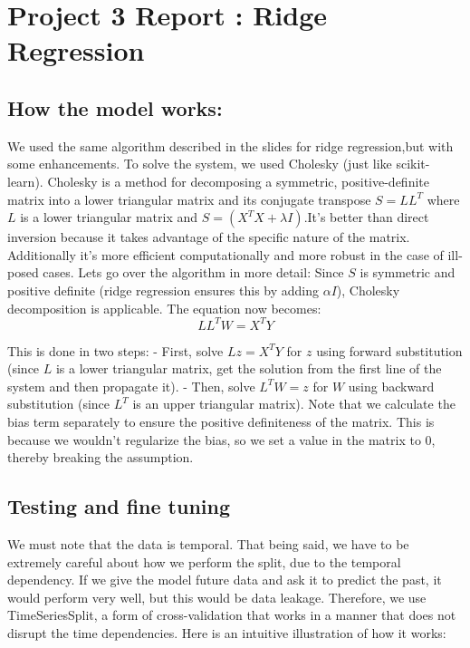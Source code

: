 \documentclass[
]{article}
\author{}
\date{}
\begin{document}
\section{Project 3 Report : Ridge
Regression}\label{project-3-report-ridge-regression}

\subsection{How the model works:}\label{how-the-model-works}

We used the same algorithm described in the slides for ridge
regression,but with some enhancements. To solve the system, we used
Cholesky (just like scikit-learn). Cholesky is a method for decomposing
a symmetric, positive-definite matrix into a lower triangular matrix and
its conjugate transpose \(S=L L^T\) where \(L\) is a lower triangular
matrix and \(S=\left(X^T X+\lambda I\right)\).It's better than direct
inversion because it takes advantage of the specific nature of the
matrix. Additionally it's more efficient computationally and more robust
in the case of ill-posed cases. Lets go over the algorithm in more
detail: Since \(S\) is symmetric and positive definite (ridge regression
ensures this by adding \(\alpha I\)), Cholesky decomposition is
applicable. The equation now becomes: \[
L L^T W=X^T Y
\]

This is done in two steps: - First, solve \(L z=X^T Y\) for \(z\) using
forward substitution (since \(L\) is a lower triangular matrix, get the
solution from the first line of the system and then propagate it). -
Then, solve \(L^T W=z\) for \(W\) using backward substitution (since
\(L^T\) is an upper triangular matrix). Note that we calculate the bias
term separately to ensure the positive definiteness of the matrix. This
is because we wouldn't regularize the bias, so we set a value in the
matrix to 0, thereby breaking the assumption. 
\subsection{Testing and fine tuning}\label{Tetsing and finetuning}
We must note that the data is temporal. That being said, we have
to be extremely careful about how we perform the split, due to the
temporal dependency. If we give the model future data and ask it to
predict the past, it would perform very well, but this would be data
leakage. Therefore, we use TimeSeriesSplit, a form of cross-validation
that works in a manner that does not disrupt the time dependencies. Here
is an intuitive illustration of how it works:
\end{document}
